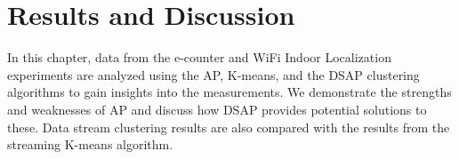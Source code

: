 \setlength{\parindent}{2em}






% 
\chapter{Results and Discussion}

In this chapter, data from the e-counter and WiFi Indoor Localization experiments are analyzed using the AP, K-means, and the DSAP clustering algorithms to gain insights into the measurements. We demonstrate the strengths and weaknesses of AP and discuss how DSAP provides potential solutions to these. Data stream clustering results are also compared with the results from the streaming K-means algorithm. 

